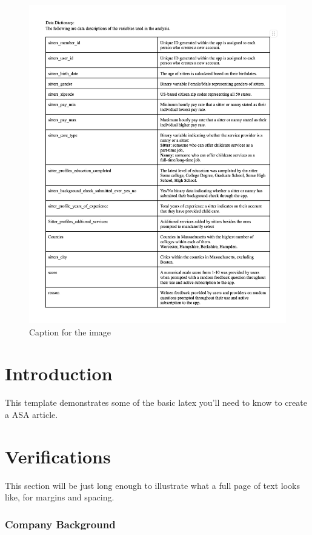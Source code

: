 \documentclass[12pt]{article}
\begin{document}
\begin{figure}
\centering
\includegraphics{IMAGES/data_dictionary.png}
\caption{Caption for the image}
\end{figure}

\hypertarget{introduction}{%
\section{Introduction}\label{introduction}}

This template demonstrates some of the basic latex you'll need to know
to create a ASA article.

\section{Verifications}
\label{sec:verify}

This section will be just long enough to illustrate what a full page of
text looks like, for margins and spacing.

\hypertarget{company-background}{%
\subsubsection{\texorpdfstring{\textbf{Company
Background}}{Company Background}}\label{company-background}}
\end{document}
